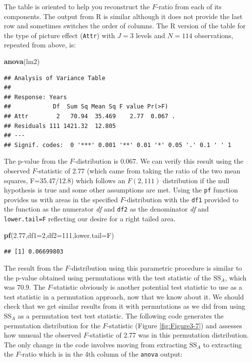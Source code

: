\documentclass[]{book}
\newenvironment{Shaded}{\begin{snugshade}}{\end{snugshade}}
\newcommand{\KeywordTok}[1]{\textcolor[rgb]{0.13,0.29,0.53}{\textbf{#1}}}
\newcommand{\DataTypeTok}[1]{\textcolor[rgb]{0.13,0.29,0.53}{#1}}
\newcommand{\DecValTok}[1]{\textcolor[rgb]{0.00,0.00,0.81}{#1}}
\newcommand{\FloatTok}[1]{\textcolor[rgb]{0.00,0.00,0.81}{#1}}
\newcommand{\NormalTok}[1]{#1}
\begin{document}
The table is oriented to help you reconstruct the \(F\)-ratio from each
of its components. The output from R is similar although it does not
provide the last row and sometimes switches the order of columns. The R
version of the table for the type of picture effect (\texttt{Attr}) with
\(J=3\) levels and \(N=114\) observations, repeated from above, is:

\begin{Shaded}
\begin{Highlighting}[]
\KeywordTok{anova}\NormalTok{(lm2)}
\end{Highlighting}
\end{Shaded}

\begin{verbatim}
## Analysis of Variance Table
## 
## Response: Years
##            Df  Sum Sq Mean Sq F value Pr(>F)  
## Attr        2   70.94  35.469    2.77  0.067 .
## Residuals 111 1421.32  12.805                 
## ---
## Signif. codes:  0 '***' 0.001 '**' 0.01 '*' 0.05 '.' 0.1 ' ' 1
\end{verbatim}

The p-value from the \(F\)-distribution is 0.067. We can verify this
result using the observed \(F\)-statistic of 2.77 (which came from
taking the ratio of the two mean squares, F=35.47/12.8) which follows an
\(F(2, 111)\) distribution if the null hypothesis is true and some other
assumptions are met. Using the \texttt{pf} function provides us with
areas in the specified \(F\)-distribution with the \texttt{df1} provided
to the function as the numerator \emph{df} and \texttt{df2} as the
denominator \emph{df} and \texttt{lower.tail=F} reflecting our desire
for a right tailed area.

\begin{Shaded}
\begin{Highlighting}[]
\KeywordTok{pf}\NormalTok{(}\FloatTok{2.77}\NormalTok{,}\DataTypeTok{df1=}\DecValTok{2}\NormalTok{,}\DataTypeTok{df2=}\DecValTok{111}\NormalTok{,}\DataTypeTok{lower.tail=}\NormalTok{F)}
\end{Highlighting}
\end{Shaded}

\begin{verbatim}
## [1] 0.06699803
\end{verbatim}

The result from the \(F\)-distribution using this parametric procedure
is similar to the p-value obtained using permutations with the test
statistic of the \(\text{SS}_A\), which was 70.9. The \(F\)-statistic
obviously is another potential test statistic to use as a test statistic
in a permutation approach, now that we know about it. We should check
that we get similar results from it with permutations as we did from
using \(\text{SS}_A\) as a permutation test test statistic. The
following code generates the permutation distribution for the
\(F\)-statistic (Figure \ref{fig:Figure3-7}) and assesses how unusual
the observed \(F\)-statistic of 2.77 was in this permutation
distribution. The only change in the code involves moving from
extracting \(\text{SS}_A\) to extracting the \(F\)-ratio which is in the
4th column of the \texttt{anova} output:
\end{document}

